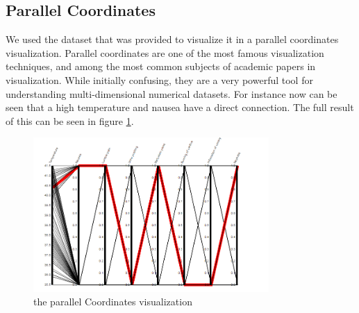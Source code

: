 \documentclass[a4paper,twoside,11pt]{article}
\begin{document}
\subsection{Parallel Coordinates}
We used the dataset that was provided to visualize it in a parallel coordinates visualization. Parallel coordinates are one of the most famous visualization techniques, and among the most common subjects of academic papers in visualization. While initially confusing, they are a very powerful tool for understanding multi-dimensional numerical datasets. \newline
For instance now can be seen that a high temperature and nausea have a direct connection. The full result of this can be seen in figure \ref{fig:Parallel}.
\begin{figure}[h]
\begin{center}
    \includegraphics[width=0.8\textwidth]{images/ParallelCoordinates.PNG}
    \caption{the parallel Coordinates visualization}
    \label{fig:Parallel}
\end{center}
\end{figure}
\newpage
\end{document}
